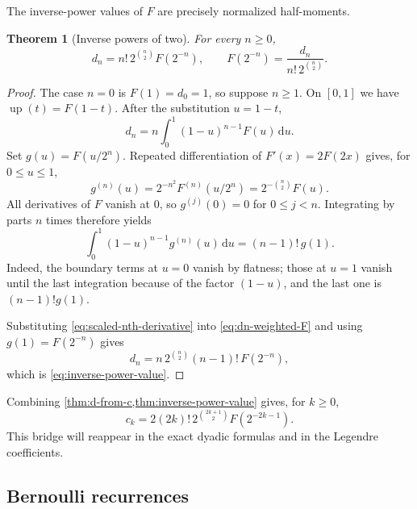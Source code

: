 \documentclass[11pt,oneside]{article}
\newtheorem{theorem}{Theorem}[section]
\theoremstyle{definition}
\theoremstyle{remark}
\newcommand{\upf}{\operatorname{up}}
\newcommand{\dd}{\,\mathrm d}
\begin{document}
The inverse-power values of $F$ are precisely normalized half-moments.

\begin{theorem}[Inverse powers of two]\label{thm:inverse-power-value}
For every $n\ge0$,
\begin{equation}\label{eq:inverse-power-value}
  d_n=n!\,2^{\binom n2}F(2^{-n}),
  \qquad
  F(2^{-n})=\frac{d_n}{n!\,2^{\binom n2}}.
\end{equation}
\end{theorem}

\begin{proof}
The case $n=0$ is $F(1)=d_0=1$, so suppose $n\ge1$.  On $[0,1]$ we have
$\upf(t)=F(1-t)$.  After the substitution $u=1-t$,
\begin{equation}\label{eq:dn-weighted-F}
  d_n=n\int_0^1(1-u)^{n-1}F(u)\dd u.
\end{equation}
Set $g(u)=F(u/2^n)$.  Repeated differentiation of
$F'(x)=2F(2x)$ gives, for $0\le u\le1$,
\begin{equation}\label{eq:scaled-nth-derivative}
  g^{(n)}(u)
  =2^{-n^2}F^{(n)}(u/2^n)
  =2^{-\binom n2}F(u).
\end{equation}
All derivatives of $F$ vanish at $0$, so $g^{(j)}(0)=0$ for
$0\le j<n$.  Integrating by parts $n$ times therefore yields
\begin{equation}\label{eq:beta-derivative-integral}
  \int_0^1(1-u)^{n-1}g^{(n)}(u)\dd u=(n-1)!\,g(1).
\end{equation}
Indeed, the boundary terms at $u=0$ vanish by flatness; those at $u=1$
vanish until the last integration because of the factor $(1-u)$, and the
last one is $(n-1)!g(1)$.

Substituting \eqref{eq:scaled-nth-derivative} into
\eqref{eq:dn-weighted-F} and using $g(1)=F(2^{-n})$ gives
\[
 d_n=n\,2^{\binom n2}(n-1)!\,F(2^{-n}),
\]
which is \eqref{eq:inverse-power-value}.
\end{proof}

Combining \cref{thm:d-from-c,thm:inverse-power-value} gives, for $k\ge0$,
\begin{equation}\label{eq:moment-from-inverse-F}
  c_k=2(2k)!\,2^{\binom{2k+1}{2}}F(2^{-2k-1}).
\end{equation}
This bridge will reappear in the exact dyadic formulas and in the Legendre
coefficients.

\subsection{Bernoulli recurrences}
\end{document}
